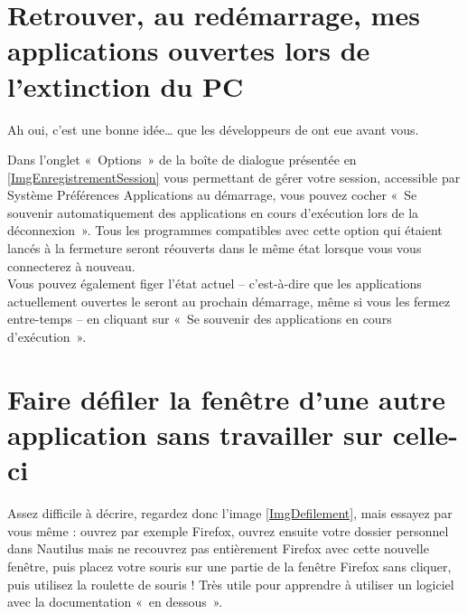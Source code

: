 \section{Retrouver, au redémarrage, mes applications ouvertes lors de l'extinction du PC}
\label{RefEnrSession}
Ah oui, c'est une bonne idée\ldots{} que les développeurs de  ont eue avant vous.\par
Dans l'onglet «~Options~» de la boîte de dialogue présentée en \ref{ImgEnregistrementSession} vous permettant de gérer votre session, accessible par Système \FlecheDroite Préférences \FlecheDroite Applications au démarrage, vous pouvez cocher «~Se souvenir automatiquement des applications en cours d'exécution lors de la déconnexion~». Tous les programmes compatibles avec cette option qui étaient lancés à la fermeture seront réouverts dans le même état lorsque vous vous connecterez à nouveau.\\
Vous pouvez également figer l'état actuel -- c'est-à-dire que les applications actuellement ouvertes le seront au prochain démarrage, même si vous les fermez entre-temps -- en cliquant sur «~Se souvenir des applications en cours d'exécution~».
\section{Faire défiler la fenêtre d'une autre application sans travailler sur celle-ci}
Assez difficile à décrire, regardez donc l'image \ref{ImgDefilement}, mais essayez par vous même : ouvrez par exemple Firefox, ouvrez ensuite votre dossier personnel dans Nautilus mais ne recouvrez pas entièrement Firefox avec cette nouvelle fenêtre, puis placez votre souris sur une partie de la fenêtre Firefox sans cliquer, puis utilisez la roulette de souris ! Très utile pour apprendre à utiliser un logiciel avec la documentation «~en dessous~».
